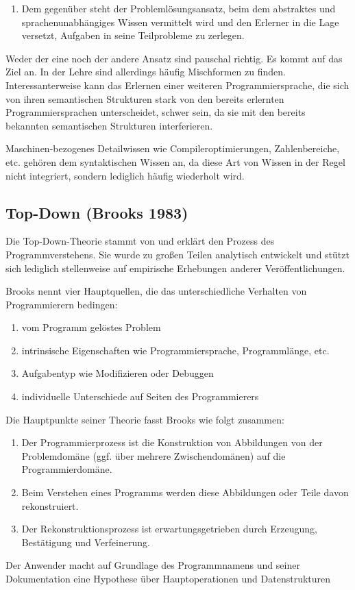 \begin{description}
\begin{enumerate}
\item Dem gegenüber steht der Problemlösungsansatz, beim dem abstraktes und sprachenunabhängiges Wissen vermittelt wird und den Erlerner in die Lage versetzt, Aufgaben in seine Teilprobleme zu zerlegen.
\end{enumerate}
Weder der eine noch der andere Ansatz sind pauschal richtig. Es kommt auf das Ziel an. In der Lehre sind allerdings häufig Mischformen zu finden.
Interessanterweise kann das Erlernen einer weiteren Programmiersprache, die sich von ihren semantischen Strukturen stark von den bereits erlernten Programmiersprachen unterscheidet, schwer sein, da sie mit den bereits bekannten semantischen Strukturen interferieren.

Maschinen-bezogenes Detailwissen wie Compileroptimierungen, Zahlenbereiche, etc. gehören dem syntaktischen Wissen an, da diese Art von Wissen in der Regel nicht integriert, sondern lediglich häufig wiederholt wird.
\end{description}



\subsection{Top-Down (Brooks 1983)}
\label{sec:topdown}

Die Top-Down-Theorie stammt von \cite{Brooks:1983fj} und erklärt den Prozess des Programmverstehens. Sie wurde zu großen Teilen analytisch entwickelt und stützt sich lediglich stellenweise auf empirische Erhebungen anderer Veröffentlichungen.

Brooks nennt vier Hauptquellen, die das unterschiedliche Verhalten von Programmierern bedingen:
\begin{enumerate}
\itemsep1pt\parskip0pt
\item vom Programm gelöstes Problem
\item intrinsische Eigenschaften wie Programmiersprache, Programmlänge, etc.
\item Aufgabentyp wie Modifizieren oder Debuggen
\item individuelle Unterschiede auf Seiten des Programmierers
\end{enumerate}

Die Hauptpunkte seiner Theorie fasst Brooks wie folgt zusammen:
\begin{enumerate}
\itemsep1pt\parskip0pt
\item Der Programmierprozess ist die Konstruktion von Abbildungen von der Problemdomäne (ggf. über mehrere Zwischendomänen) auf die Programmierdomäne.
\item Beim Verstehen eines Programms werden diese Abbildungen oder Teile davon rekonstruiert.
\item Der Rekonstruktionsprozess ist erwartungsgetrieben durch Erzeugung, Bestätigung und Verfeinerung.
\end{enumerate}
Der Anwender macht auf Grundlage des Programmnamens und seiner Dokumentation eine Hypothese über Hauptoperationen und Datenstrukturen

